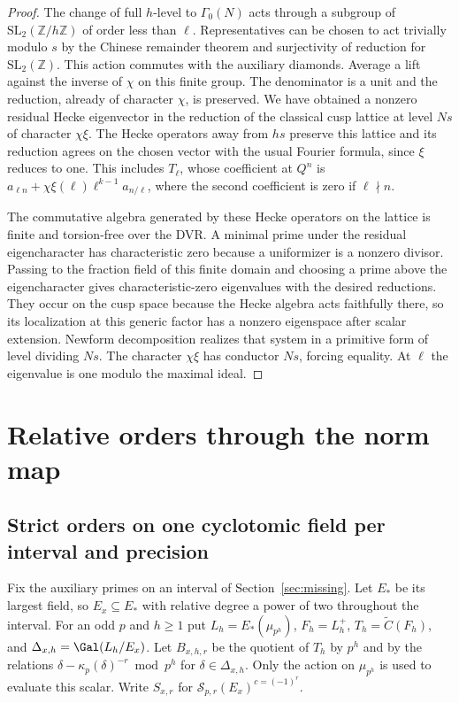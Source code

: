 \documentclass[a4paper,11pt]{article}
\theoremstyle{definition}
\theoremstyle{remark}
\newcommand{\ZZ}{\mathbb Z}\newcommand{\ord}{\operatorname{ord}}
\numberwithin{equation}{section}
\begin{document}
\begin{proof}
The change of full \(h\)-level to \(\Gamma_0(N)\) acts through
a subgroup of \(\mathrm{SL}_2(\ZZ/h\ZZ)\) of order less than
\(\ell\). Representatives can be chosen to act trivially modulo
\(s\) by the Chinese remainder theorem and surjectivity of
reduction for \(\mathrm{SL}_2(\ZZ)\). This action commutes with
the auxiliary diamonds.
Average a lift against the inverse of \(\chi\) on this finite
group. The denominator is a unit and the reduction, already
of character \(\chi\), is preserved. We have obtained a nonzero
residual Hecke eigenvector in the reduction of the classical
cusp lattice at level \(Ns\) of character \(\chi\xi\).
The Hecke operators away from \(hs\) preserve this lattice
and its reduction agrees on the chosen vector with the usual
Fourier formula, since \(\xi\) reduces to one. This includes
\(T_\ell\), whose coefficient at \(Q^n\) is
\(a_{\ell n}+\chi\xi(\ell)\ell^{k-1}a_{n/\ell}\),
where the second coefficient is zero if \(\ell\nmid n\).

The commutative algebra generated by these Hecke operators on
the lattice is finite and torsion-free over the DVR. A minimal
prime under the residual eigencharacter has characteristic
zero because a uniformizer is a nonzero divisor. Passing to
the fraction field of this finite domain and choosing a prime
above the eigencharacter gives characteristic-zero eigenvalues
with the desired reductions. They occur on the cusp space
because the Hecke algebra acts faithfully there, so its
localization at this generic factor has a nonzero eigenspace
after scalar extension. Newform decomposition realizes that
system in a primitive form of level dividing \(Ns\).
The character \(\chi\xi\) has conductor \(Ns\), forcing equality.
At \(\ell\) the eigenvalue is one modulo the maximal ideal.
\end{proof}

\section{Relative orders through the norm map}\label{nav:g-II-4}

\subsection{Strict orders on one cyclotomic field per interval and precision}\label{nav:II-77}
Fix the auxiliary primes on an interval of
Section~\ref{sec:missing}. Let \(E_*\) be its largest
field, so \(E_x\subseteq E_*\) with relative degree a
power of two throughout the interval. For an odd \(p\) and
\(h\ge1\) put \(L_h=E_*(\mu_{p^h})\), \(F_h=L_h^+\),
\(T_h=\widetilde C(F_h)\), and
\(\Delta_{x,h}=\Gal(L_h/E_x)\). Let \(B_{x,h,r}\) be the
quotient of \(T_h\) by \(p^h\) and by the relations
\(\delta-\kappa_p(\delta)^{-r}\bmod p^h\) for
\(\delta\in\Delta_{x,h}\). Only the action on \(\mu_{p^h}\)
is used to evaluate this scalar. Write \(S_{x,r}\) for
\(\mathcal S_{p,r}(E_x)^{c=(-1)^r}\).
\end{document}
